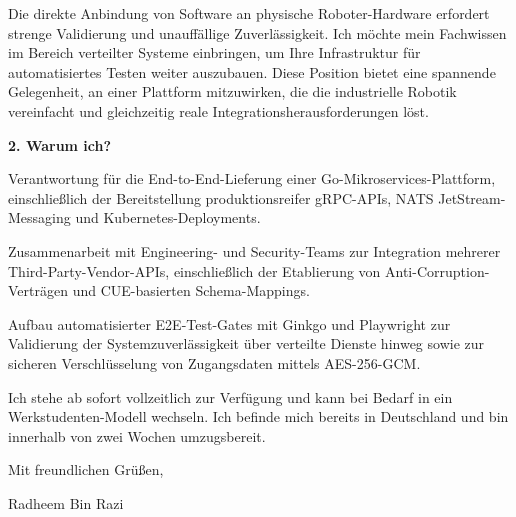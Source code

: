 \documentclass[11pt,a4paper]{coverletter}
\begin{document}
Die direkte Anbindung von Software an physische Roboter-Hardware erfordert strenge Validierung und unauffällige Zuverlässigkeit. Ich möchte mein Fachwissen im Bereich verteilter Systeme einbringen, um Ihre Infrastruktur für automatisiertes Testen weiter auszubauen. Diese Position bietet eine spannende Gelegenheit, an einer Plattform mitzuwirken, die die industrielle Robotik vereinfacht und gleichzeitig reale Integrationsherausforderungen löst.

\vspace{8pt}\noindent\textbf{2. Warum ich?}\par\vspace{3pt}

\bullets

  \item Verantwortung für die End-to-End-Lieferung einer Go-Mikroservices-Plattform, einschließlich der Bereitstellung produktionsreifer gRPC-APIs, NATS JetStream-Messaging und Kubernetes-Deployments.

  \item Zusammenarbeit mit Engineering- und Security-Teams zur Integration mehrerer Third-Party-Vendor-APIs, einschließlich der Etablierung von Anti-Corruption-Verträgen und CUE-basierten Schema-Mappings.

  \item Aufbau automatisierter E2E-Test-Gates mit Ginkgo und Playwright zur Validierung der Systemzuverlässigkeit über verteilte Dienste hinweg sowie zur sicheren Verschlüsselung von Zugangsdaten mittels AES-256-GCM.

\bulletsend

Ich stehe ab sofort vollzeitlich zur Verfügung und kann bei Bedarf in ein Werkstudenten-Modell wechseln. Ich befinde mich bereits in Deutschland und bin innerhalb von zwei Wochen umzugsbereit.

\closing{Mit freundlichen Grüßen,}{Radheem Bin Razi}
\end{document}
